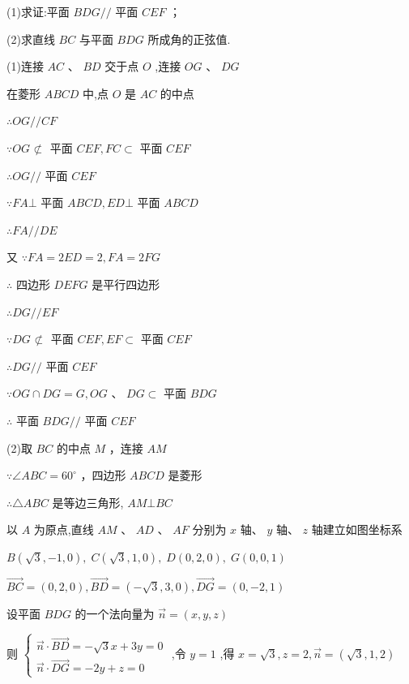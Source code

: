 \documentclass[10pt]{article}
\begin{document}
(1)求证:平面 \({BDG}//\) 平面 \({CEF}\) ；

(2)求直线 \({BC}\) 与平面 \({BDG}\) 所成角的正弦值.

(1)连接 \({AC}\text{ 、 }{BD}\) 交于点 \(O\) ,连接 \({OG}\text{ 、 }{DG}\)

在菱形 \({ABCD}\) 中,点 \(O\) 是 \({AC}\) 的中点

\(\therefore {OG}//{CF}\)

\(\because {OG} \text{ ⊄ }\) 平面 \({CEF},{FC} \subset\) 平面 \({CEF}\)

\(\therefore {OG}//\) 平面 \({CEF}\)

\(\because {FA} \bot\) 平面 \({ABCD},{ED} \bot\) 平面 \({ABCD}\)

\(\therefore {FA}//{DE}\)

又 \(\because {FA} = {2ED} = 2,{FA} = {2FG}\)

\(\therefore\) 四边形 \({DEFG}\) 是平行四边形

\(\therefore {DG}//{EF}\)

\(\because {DG} \text{ ⊄ }\) 平面 \({CEF},{EF} \subset\) 平面 \({CEF}\)

\(\therefore {DG}//\) 平面 \({CEF}\)

\(\because {OG} \cap  {DG} = G,{OG}\text{ 、 }{DG} \subset\) 平面 \({BDG}\)

\(\therefore\) 平面 \({BDG}//\) 平面 \({CEF}\)

(2)取 \({BC}\) 的中点 \(M\) ，连接 \({AM}\)

\(\because \angle {ABC} = {60}^{ \circ  }\) ，四边形 \({ABCD}\) 是菱形

\(\therefore \bigtriangleup {ABC}\) 是等边三角形, \({AM} \bot  {BC}\)

以 \(A\) 为原点,直线 \({AM}\text{ 、 }{AD}\text{ 、 }{AF}\) 分别为 \(x\) 轴、 \(y\) 轴、 \(z\) 轴建立如图坐标系

\(B\left( {\sqrt{3}, - 1,0}\right) ,\;C\left( {\sqrt{3},1,0}\right) ,\;D\left( {0,2,0}\right) ,\;G\left( {0,0,1}\right)\)

\(\overrightarrow{BC} = \left( {0,2,0}\right) ,\overrightarrow{BD} = \left( {-\sqrt{3},3,0}\right) ,\overrightarrow{DG} = \left( {0, - 2,1}\right)\)

设平面 \({BDG}\) 的一个法向量为 \(\overrightarrow{n} = \left( {x,y,z}\right)\)

则 \(\left\{  \begin{array}{l} \overrightarrow{n} \cdot  \overrightarrow{BD} =  - \sqrt{3}x + {3y} = 0 \\  \overrightarrow{n} \cdot  \overrightarrow{DG} =  - {2y} + z = 0 \end{array}\right.\) ,令 \(y = 1\) ,得 \(x = \sqrt{3},z = 2,\overrightarrow{n} = \left( {\sqrt{3},1,2}\right)\)
\end{document}
